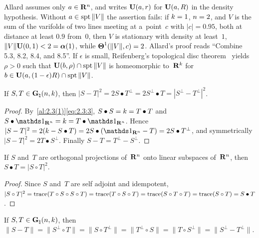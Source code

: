 \begin{remark}
    \label{rem:8.8}
    Allard assumes only $a \in \mathbf{R}^{n}$, and writes $\mathbf{U}(a,r)$ for $\mathbf{U}(a,R)$ in the density
    hypothesis. Without $a \in \operatorname{spt} \|V\|$ the assertion fails: if $k = 1$, $n = 2$, and $V$ is
    the sum of the varifolds of two lines meeting at a~point~$c$ with $|c| = 0.95$, both at distance
    at least $0.9$ from~$0$, then $V$ is stationary with density at least~$1$, $\|V\| \mathbf{U}(0,1) < 2
    = \boldsymbol{\alpha}(1)$, while $\boldsymbol{\Theta}^1(\|V\|,c) = 2$. Allard's proof reads ``Combine 5.3, 8.2, 8.4,
    and 8.5''. If $\epsilon$ is small, Reifenberg's topological disc
    theorem~\cite[p.~64, Theorem]{Reifenberg1960a} yields $\rho > 0$ such that $\mathbf{U}(b,\rho) \cap
    \operatorname{spt} \|V\|$ is homeomorphic to~$\mathbf{R}^{k}$ for $b \in \mathbf{U}(a,(1-\epsilon)R) \cap \operatorname{spt} \|V\|$.
\end{remark}

\begin{lemma}
    \label{al:8.9(1)}
    If $S, T \in \mathbf{G}_{\natural}(n,k)$, then $|S - T|^2 = 2 S \bullet T^\perp = 2 S^\perp \bullet T
    = |S^\perp - T^\perp|^2$.
\end{lemma}

\begin{proof}
    By~\ref{al:2.3(1)}\eqref{eq:2.3:3}, $S \bullet S = k = T \bullet T$ and $S \bullet
    \id{\R^{\adim}} = \vdim = T \bullet \id{\R^{\adim}}$. Hence $|S - T|^2 = 2 (\vdim - S \bullet T) =
    2 S \bullet (\id{\R^{\adim}} - T) = 2 S \bullet T^\perp$, and symmetrically $|S - T|^2 = 2 T
    \bullet S^\perp$. Finally $S - T = T^\perp - S^\perp$.
\end{proof}

\begin{lemma}
    \label{al:8.9(2)}
    If $S$ and~$T$ are orthogonal projections of~$\mathbf{R}^{n}$ onto linear subspaces of~$\mathbf{R}^{n}$,
    then $S \bullet T = |S \circ T|^2$.
\end{lemma}

\begin{proof}
    Since $S$ and~$T$ are self adjoint and idempotent, $|S \circ T|^2 = \operatorname{trace}(T \circ S \circ S
    \circ T) = \operatorname{trace}(T \circ S \circ T) = \operatorname{trace}(S \circ T \circ T) = \operatorname{trace}(S \circ T) = S \bullet
    T$.
\end{proof}

\begin{lemma}
    \label{al:8.9(3)}
    If $S, T \in \mathbf{G}_{\natural}(n,k)$, then $\|S - T\| = \|S^\perp \circ T\| = \|S \circ
    T^\perp\| = \|T^\perp \circ S\| = \|T \circ S^\perp\| = \|S^\perp - T^\perp\|$.
\end{lemma}

